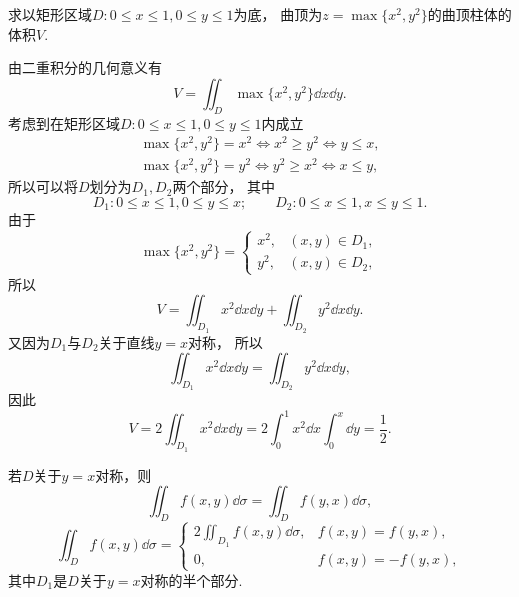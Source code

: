 \begin{example}
求以矩形区域\(D: 0 \leq x \leq 1,0 \leq y \leq 1\)为底，
曲顶为\(z = \max\{x^2,y^2\}\)的曲顶柱体的体积\(V\).
\begin{solution}
由二重积分的几何意义有\begin{equation*}
	V = \iint_D \max\{x^2,y^2\} \dd{x}\dd{y}.
\end{equation*}
考虑到在矩形区域\(D: 0 \leq x \leq 1,0 \leq y \leq 1\)内成立\begin{gather*}
	\max\{x^2,y^2\} = x^2
	\iff
	x^2 \geq y^2
	\iff
	y \leq x, \\
	\max\{x^2,y^2\} = y^2
	\iff
	y^2 \geq x^2
	\iff
	x \leq y,
\end{gather*}
所以可以将\(D\)划分为\(D_1,D_2\)两个部分，
其中\begin{equation*}
	D_1: 0 \leq x \leq 1,0 \leq y \leq x;
	\qquad
	D_2: 0 \leq x \leq 1,x \leq y \leq 1.
\end{equation*}
由于\begin{equation*}
	\max\{x^2,y^2\} = \begin{cases}
		x^2, & (x,y) \in D_1, \\
		y^2, & (x,y) \in D_2,
	\end{cases}
\end{equation*}
所以\begin{equation*}
	V
	= \iint_{D_1} x^2 \dd{x}\dd{y}
	+ \iint_{D_2} y^2 \dd{x}\dd{y}.
\end{equation*}
又因为\(D_1\)与\(D_2\)关于直线\(y=x\)对称，
所以\begin{equation*}
	\iint_{D_1} x^2 \dd{x}\dd{y}
	= \iint_{D_2} y^2 \dd{x}\dd{y},
\end{equation*}
因此\begin{equation*}
	V = 2 \iint_{D_1} x^2 \dd{x}\dd{y}
	= 2 \int_0^1 x^2 \dd{x} \int_0^x \dd{y}
	= \frac12.
\end{equation*}
\end{solution}
\end{example}

若\(D\)关于\(y=x\)对称，则\[
	\iint_D f(x,y) \dd{\sigma} = \iint_D f(y,x) \dd{\sigma},
\]\[
	\iint_D f(x,y) \dd{\sigma}
	= \left\{ \begin{array}{cc}
		2 \iint_{D_1} f(x,y) \dd{\sigma}, & f(x,y) = f(y,x), \\
		0, & f(x,y) = -f(y,x),
	\end{array} \right.
\]
其中\(D_1\)是\(D\)关于\(y=x\)对称的半个部分.

